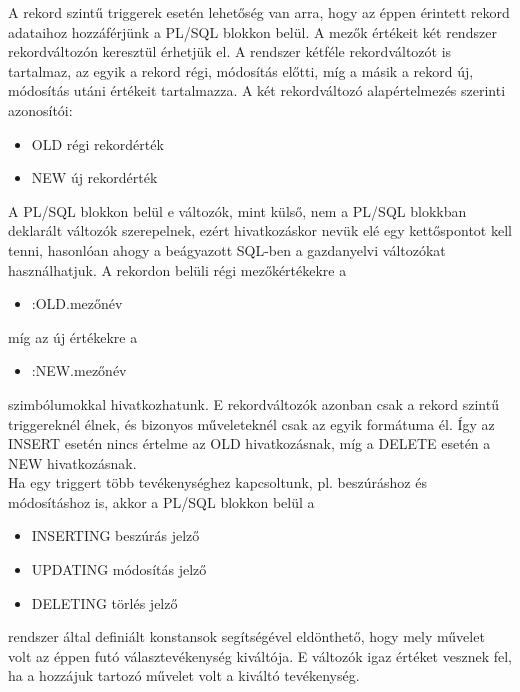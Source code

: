 \documentclass[tikz,12pt,margin=0px]{article}
\begin{document}
    \noindent A rekord szintű triggerek esetén lehetőség van arra, hogy az éppen érintett rekord adataihoz hozzáférjünk a PL/SQL blokkon belül. A mezők értékeit két rendszer rekordváltozón keresztül érhetjük el. A rendszer kétféle rekordváltozót is tartalmaz, az egyik a rekord régi, módosítás előtti, míg a másik a rekord új, módosítás utáni értékeit tartalmazza. A két rekordváltozó alapértelmezés szerinti azonosítói:
    \begin{itemize}
	   \item OLD			régi rekordérték
	   \item NEW			új rekordérték
    \end{itemize}
    \noindent A PL/SQL blokkon belül e változók, mint külső, nem a PL/SQL blokkban deklarált változók szerepelnek, ezért hivatkozáskor nevük elé egy kettőspontot kell tenni, hasonlóan ahogy a beágyazott SQL-ben a gazdanyelvi változókat használhatjuk. A rekordon belüli régi mezőkértékekre a
    \begin{itemize}
	   \item :OLD.mezőnév
    \end{itemize}
    míg az új értékekre a
    \begin{itemize}
        \item :NEW.mezőnév
    \end{itemize}
    szimbólumokkal hivatkozhatunk. E rekordváltozók azonban csak a rekord szintű triggereknél élnek, és bizonyos műveleteknél csak az egyik formátuma él. Így az INSERT esetén nincs értelme az OLD hivatkozásnak, míg a DELETE esetén a NEW hivatkozásnak.\\
\newpage
    \noindent Ha egy triggert több tevékenységhez kapcsoltunk, pl. beszúráshoz és módosításhoz is, akkor a PL/SQL blokkon belül a
    \begin{itemize}
	   \item INSERTING			beszúrás jelző
	   \item UPDATING			módosítás jelző
	   \item DELETING			törlés jelző
    \end{itemize}
    rendszer által definiált konstansok segítségével eldönthető, hogy mely művelet volt az éppen futó választevékenység kiváltója. E változók igaz értéket vesznek fel, ha a hozzájuk tartozó művelet volt  a kiváltó tevékenység.\\
\end{document}
